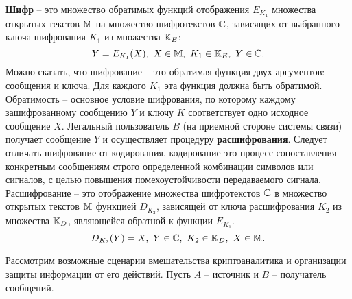 \textbf{Шифр} -- это множество обратимых функций отображения $E_{K_1}$ множества открытых текстов $\mathbb{M}$ на множество шифротекстов $\mathbb{C}$, зависящих от выбранного ключа шифрования $K_1$ из множества $\mathbb{K}_E$:
\begin{equation}
    \label{eq:Encryption}
    Y = E_{K_1}(X), ~ X \in \mathbb{M}, ~ K_1 \in \mathbb{K}_E, ~ Y \in \mathbb{C}.
\end{equation}
Можно сказать, что шифрование -- это обратимая функция двух аргументов: сообщения и ключа. Для каждого $K_1$ эта функция должна быть обратимой.  Обратимость -- основное условие шифрования, по которому каждому зашифрованному сообщению $Y$ и ключу $K$ соответствует одно исходное сообщение $X$. Легальный пользователь $B$ (на приемной стороне системы связи)  получает сообщение $Y$ и осуществляет процедуру \textbf{расшифрования}.
Следует отличать шифрование от кодирования, кодирование это процесс сопоставления конкретным сообщениям строго определенной комбинации символов или сигналов, с целью повышения помехоустойчивости передаваемого сигнала.
Расшифрование --  это отображение множества шифротекстов $\mathbb{C}$ в множество открытых текстов $\mathbb{M}$ функцией $D_{K_2}$, зависящей от ключа расшифрования $K_2$ из множества $\mathbb{K}_D$, являющейся обратной к функции $E_{K_1}$.
\begin{equation}
    \label{eq:Decryption}
    D_{K_2}(Y) = X, ~ Y \in \mathbb{C}, ~ K_2 \in \mathbb{K}_D, ~ X \in \mathbb{M}.
\end{equation}



Рассмотрим  возможные сценарии вмешательства криптоаналитика и организации защиты информации от его действий.
Пусть  $A$ --  источник и $B$ -- получатель сообщений.

